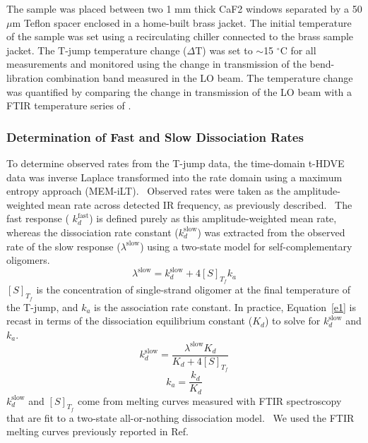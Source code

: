 \documentclass[journal=jpcbfk,manuscript=article]{achemso}
\begin{document}
The sample was placed between two 1 mm thick CaF2 windows separated by a 50 $\mu$m Teflon spacer enclosed in a home-built brass jacket. The initial temperature of the sample was set using a recirculating chiller connected to the brass sample jacket. The T-jump temperature change ($\Delta$T) was set to $\sim$15 $^\circ$C for all measurements and monitored using the change in transmission of the  bend-libration combination band measured in the LO beam. The temperature change was quantified by comparing the change in transmission of the LO beam with a FTIR temperature series of . 

\subsubsection{Determination of Fast and Slow Dissociation Rates}\label{sec:TjumpAnalysis}

To determine observed rates from the T-jump data, the time-domain t-HDVE data was inverse Laplace transformed into the rate domain using a maximum entropy approach (MEM-iLT).~\citep{Kumar2001OnTimescales} Observed rates were taken as the amplitude-weighted mean rate across detected IR frequency, as previously described.~\citep{Sanstead2018DirectDehybridization} The fast response ( $k_d^\mathrm{fast}$) is defined purely as this amplitude-weighted mean rate, whereas the dissociation rate constant ($k_d^\mathrm{slow}$) was extracted from the observed rate of the slow response ($\lambda^\mathrm{slow}$) using a two-state model for self-complementary oligomers.~\citep{Bernasconi2012RelaxationKinetics}
	\begin{equation}\label{e1}
	\lambda^\mathrm{slow} = k_d^\mathrm{slow} + 4[S]_{T_f}k_a
	\end{equation}
$[S]_{T_f}$ is the concentration of single-strand oligomer at the final temperature of the T-jump, and $k_a$ is the association rate constant. In practice, Equation~\ref{e1} is recast in terms of the dissociation equilibrium constant ($K_d$) to solve for $k_d^\mathrm{slow}$ and $k_a$.
	\begin{equation}\label{e2a}
	k_d^\mathrm{slow} = \frac{\lambda^\mathrm{slow}K_d}{K_d+4[S]_{T_f}}
	\end{equation}
	\begin{equation}\label{e2b}
	k_a = \frac{k_d}{K_d}
	\end{equation}
$k_d^\mathrm{slow}$ and $[S]_{T_f}$ come from melting curves measured with FTIR spectroscopy that are fit to a two-state all-or-nothing dissociation model.~\citep{Marky1987CalculatingCurves} We used the FTIR melting curves previously reported in Ref.~\citep{Sanstead2016}
\end{document}
